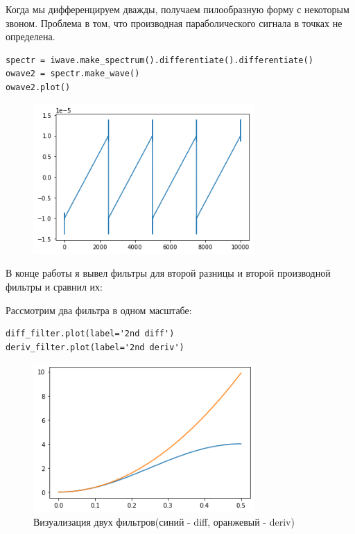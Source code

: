 \documentclass[a4paper,12pt]{report}
\begin{document}
Когда мы дифференцируем дважды, получаем пилообразную форму с некоторым звоном. Проблема в том, что производная параболического сигнала в точках не определена.

\begin{lstlisting}[H]
spectr = iwave.make_spectrum().differentiate().differentiate()
owave2 = spectr.make_wave()
owave2.plot()
\end{lstlisting}

\begin{figure}[H]
        \centering
        \includegraphics[width=0.75\textwidth]{12.png}
        \caption{}
        \label{12}
\end{figure}

В конце работы я вывел фильтры для второй разницы и второй производной фильтры и сравнил их:

Рассмотрим два фильтра в одном масштабе:

\begin{lstlisting}[caption=Визуализация двух фильтров]
diff_filter.plot(label='2nd diff')
deriv_filter.plot(label='2nd deriv')
\end{lstlisting}

\begin{figure}[H]
        \centering
        \includegraphics[width=0.75\textwidth]{13.png}
        \caption{Визуализация двух фильтров(синий - diff, оранжевый - deriv)}
        \label{13}
\end{figure}
\end{document}
